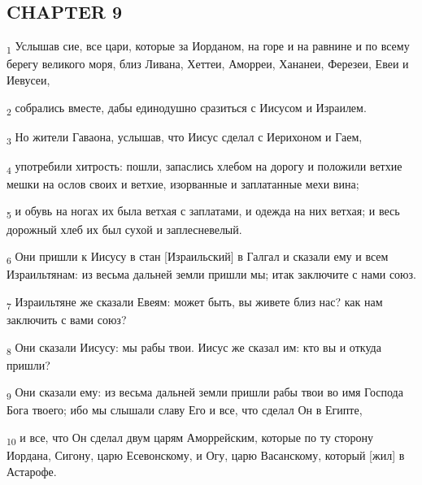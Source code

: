 \subsection{CHAPTER 9}
\begin{tcolorbox}
\textsubscript{1} Услышав сие, все цари, которые за Иорданом, на горе и на равнине и по всему берегу великого моря, близ Ливана, Хеттеи, Аморреи, Хананеи, Ферезеи, Евеи и Иевусеи,
\end{tcolorbox}
\begin{tcolorbox}
\textsubscript{2} собрались вместе, дабы единодушно сразиться с Иисусом и Израилем.
\end{tcolorbox}
\begin{tcolorbox}
\textsubscript{3} Но жители Гаваона, услышав, что Иисус сделал с Иерихоном и Гаем,
\end{tcolorbox}
\begin{tcolorbox}
\textsubscript{4} употребили хитрость: пошли, запаслись хлебом на дорогу и положили ветхие мешки на ослов своих и ветхие, изорванные и заплатанные мехи вина;
\end{tcolorbox}
\begin{tcolorbox}
\textsubscript{5} и обувь на ногах их была ветхая с заплатами, и одежда на них ветхая; и весь дорожный хлеб их был сухой и заплесневелый.
\end{tcolorbox}
\begin{tcolorbox}
\textsubscript{6} Они пришли к Иисусу в стан [Израильский] в Галгал и сказали ему и всем Израильтянам: из весьма дальней земли пришли мы; итак заключите с нами союз.
\end{tcolorbox}
\begin{tcolorbox}
\textsubscript{7} Израильтяне же сказали Евеям: может быть, вы живете близ нас? как нам заключить с вами союз?
\end{tcolorbox}
\begin{tcolorbox}
\textsubscript{8} Они сказали Иисусу: мы рабы твои. Иисус же сказал им: кто вы и откуда пришли?
\end{tcolorbox}
\begin{tcolorbox}
\textsubscript{9} Они сказали ему: из весьма дальней земли пришли рабы твои во имя Господа Бога твоего; ибо мы слышали славу Его и все, что сделал Он в Египте,
\end{tcolorbox}
\begin{tcolorbox}
\textsubscript{10} и все, что Он сделал двум царям Аморрейским, которые по ту сторону Иордана, Сигону, царю Есевонскому, и Огу, царю Васанскому, который [жил] в Астарофе.
\end{tcolorbox}
